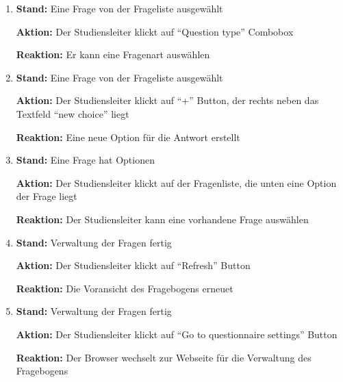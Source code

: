 \documentclass[a4paper]{scrreprt}
\begin{document}
\begin{itemize}
\begin{enumerate}
                        \item \par \textbf{Stand: } Eine Frage von der Frageliste ausgewählt
                              \par \textbf{Aktion: } Der \gls{Studiensleiter} klickt auf ``Question type'' Combobox
                              \par \textbf{Reaktion: } Er kann eine Fragenart auswählen

                        \item \par \textbf{Stand: }  Eine Frage von der Frageliste ausgewählt
                              \par \textbf{Aktion: } Der \gls{Studiensleiter} klickt auf ``+'' Button, der rechts neben das Textfeld ``new choice'' liegt
                              \par \textbf{Reaktion: } Eine neue Option für die Antwort erstellt

                        \item \par \textbf{Stand: } Eine Frage hat Optionen
                              \par \textbf{Aktion: } Der \gls{Studiensleiter} klickt auf der Fragenliste, die unten eine Option der Frage liegt
                              \par \textbf{Reaktion: }Der \gls{Studiensleiter} kann eine vorhandene Frage auswählen

                        \item \par \textbf{Stand: }  Verwaltung der Fragen fertig
                              \par \textbf{Aktion: } Der \gls{Studiensleiter} klickt auf ``Refresh'' Button
                              \par \textbf{Reaktion: } Die Voransicht des Fragebogens erneuet

                        \item \par \textbf{Stand: } Verwaltung der Fragen fertig
                              \par \textbf{Aktion: } Der \gls{Studiensleiter} klickt auf ``Go to questionnaire settings'' Button
                              \par \textbf{Reaktion: } Der Browser wechselt zur Webseite für die Verwaltung des Fragebogens


\end{enumerate}
\end{itemize}
\end{document}
